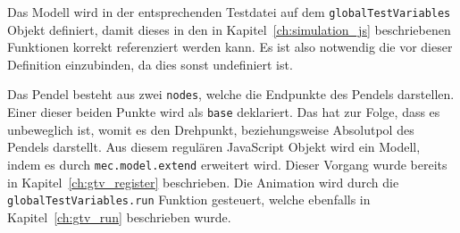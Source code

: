 Das  Modell wird in der entsprechenden Testdatei auf dem \lstinline{globalTestVariables} Objekt definiert, damit dieses in den in Kapitel~\ref{ch:simulation_js} beschriebenen Funktionen korrekt referenziert werden kann.
Es ist also notwendig die  vor dieser Definition einzubinden, da dies sonst undefiniert ist.

Das Pendel besteht aus zwei \lstinline{nodes}, welche die Endpunkte des Pendels darstellen.
Einer dieser beiden Punkte wird als \lstinline{base} deklariert.
Das hat zur Folge, dass es unbeweglich ist, womit es den Drehpunkt, beziehungsweise Absolutpol des Pendels darstellt.
Aus diesem regulären JavaScript Objekt wird ein  Modell, indem es durch \lstinline{mec.model.extend} erweitert wird.
Dieser Vorgang wurde bereits in Kapitel~\ref{ch:gtv_register} beschrieben.
Die Animation wird durch die \lstinline{globalTestVariables.run} Funktion gesteuert, welche ebenfalls in Kapitel~\ref{ch:gtv_run} beschrieben wurde.